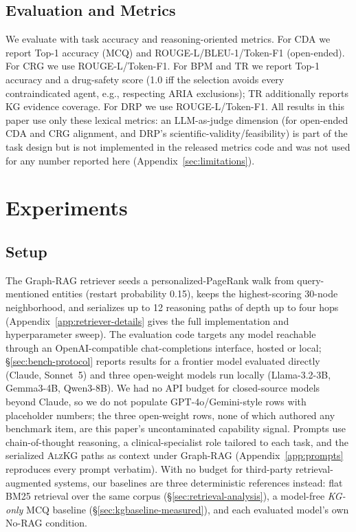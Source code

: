 \documentclass{article}
\begin{document}
\subsection{Evaluation and Metrics}
We evaluate with task accuracy and reasoning-oriented metrics. For CDA we report Top-1 accuracy (MCQ) and ROUGE-L/BLEU-1/Token-F1 (open-ended). For CRG we use ROUGE-L/Token-F1. For BPM and TR we report Top-1 accuracy and a drug-safety score (1.0 iff the selection avoids every contraindicated agent, e.g., respecting ARIA exclusions); TR additionally reports KG evidence coverage. For DRP we use ROUGE-L/Token-F1. All results in this paper use only these lexical metrics: an LLM-as-judge dimension (for open-ended CDA and CRG alignment, and DRP's scientific-validity/feasibility) is part of the task design but is not implemented in the released metrics code and was not used for any number reported here (Appendix~\ref{sec:limitations}).

\section{Experiments}

\subsection{Setup}
\label{sec:setup}
The Graph-RAG retriever seeds a personalized-PageRank walk from query-mentioned entities (restart probability 0.15), keeps the highest-scoring 30-node neighborhood, and serializes up to 12 reasoning paths of depth up to four hops (Appendix~\ref{app:retriever-details} gives the full implementation and hyperparameter sweep). The evaluation code targets any model reachable through an OpenAI-compatible chat-completions interface, hosted or local; \S\ref{sec:bench-protocol} reports results for a frontier model evaluated directly (Claude, Sonnet~5) and three open-weight models run locally (Llama-3.2-3B, Gemma3-4B, Qwen3-8B). We had no API budget for closed-source models beyond Claude, so we do not populate GPT-4o/Gemini-style rows with placeholder numbers; the three open-weight rows, none of which authored any benchmark item, are this paper's uncontaminated capability signal. Prompts use chain-of-thought reasoning, a clinical-specialist role tailored to each task, and the serialized \textsc{AlzKG} paths as context under Graph-RAG (Appendix~\ref{app:prompts} reproduces every prompt verbatim). With no budget for third-party retrieval-augmented systems, our baselines are three deterministic references instead: flat BM25 retrieval over the same corpus (\S\ref{sec:retrieval-analysis}), a model-free \emph{KG-only} MCQ baseline (\S\ref{sec:kgbaseline-measured}), and each evaluated model's own No-RAG condition.
\end{document}
